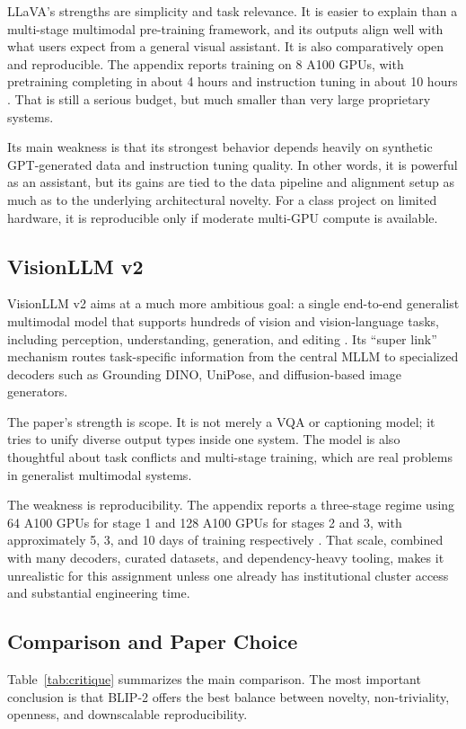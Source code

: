 \documentclass[11pt]{article}
\begin{document}
LLaVA's strengths are simplicity and task relevance. It is easier to explain than a multi-stage multimodal pre-training framework, and its outputs align well with what users expect from a general visual assistant. It is also comparatively open and reproducible. The appendix reports training on 8 A100 GPUs, with pretraining completing in about 4 hours and instruction tuning in about 10 hours \citep{liu2023visual}. That is still a serious budget, but much smaller than very large proprietary systems.

Its main weakness is that its strongest behavior depends heavily on synthetic GPT-generated data and instruction tuning quality. In other words, it is powerful as an assistant, but its gains are tied to the data pipeline and alignment setup as much as to the underlying architectural novelty. For a class project on limited hardware, it is reproducible only if moderate multi-GPU compute is available.

\subsection{VisionLLM v2}
VisionLLM v2 aims at a much more ambitious goal: a single end-to-end generalist multimodal model that supports hundreds of vision and vision-language tasks, including perception, understanding, generation, and editing \citep{wu2024visionllmv2}. Its ``super link'' mechanism routes task-specific information from the central MLLM to specialized decoders such as Grounding DINO, UniPose, and diffusion-based image generators.

The paper's strength is scope. It is not merely a VQA or captioning model; it tries to unify diverse output types inside one system. The model is also thoughtful about task conflicts and multi-stage training, which are real problems in generalist multimodal systems.

The weakness is reproducibility. The appendix reports a three-stage regime using 64 A100 GPUs for stage 1 and 128 A100 GPUs for stages 2 and 3, with approximately 5, 3, and 10 days of training respectively \citep{wu2024visionllmv2}. That scale, combined with many decoders, curated datasets, and dependency-heavy tooling, makes it unrealistic for this assignment unless one already has institutional cluster access and substantial engineering time.

\subsection{Comparison and Paper Choice}
Table~\ref{tab:critique} summarizes the main comparison. The most important conclusion is that BLIP-2 offers the best balance between novelty, non-triviality, openness, and downscalable reproducibility.
\end{document}
